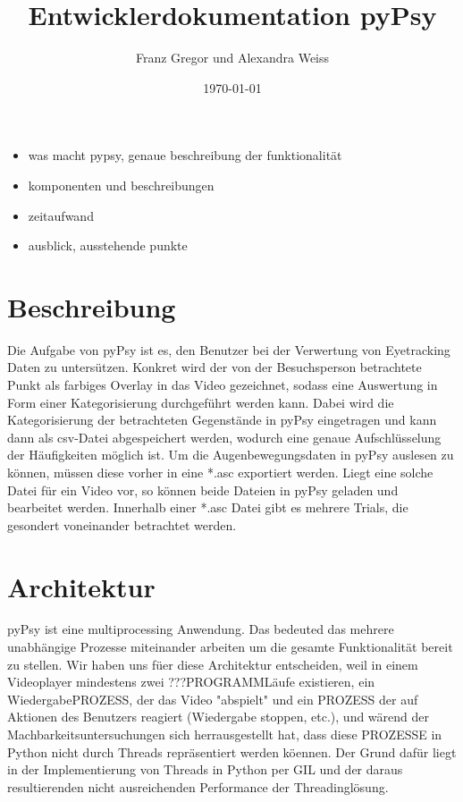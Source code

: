 \documentclass[a4paper,draft]{scrartcl}
\title{Entwicklerdokumentation pyPsy}
\author{Franz Gregor und Alexandra Weiss}
\date{\today}
\begin{document}
\maketitle
\newpage
\tableofcontents
\begin{itemize}
	\item was macht pypsy, genaue beschreibung der funktionalität
	\item komponenten und beschreibungen 
	\item zeitaufwand
	\item ausblick, ausstehende punkte
\end{itemize}
\newpage
\section{Beschreibung}
Die Aufgabe von pyPsy ist es, den Benutzer bei der Verwertung von Eyetracking Daten zu untersützen. Konkret wird der von der Besuchsperson betrachtete Punkt als farbiges Overlay in das Video gezeichnet, sodass eine Auswertung in Form einer Kategorisierung durchgeführt werden kann. Dabei wird die Kategorisierung der betrachteten Gegenstände in pyPsy eingetragen und kann dann als csv-Datei abgespeichert werden, wodurch eine genaue Aufschlüsselung der Häufigkeiten möglich ist. 
Um die Augenbewegungsdaten in pyPsy auslesen zu können, müssen diese vorher in eine *.asc exportiert werden. Liegt eine solche Datei für ein Video vor, so können beide Dateien in pyPsy geladen und bearbeitet werden.
Innerhalb einer *.asc Datei gibt es mehrere Trials, die gesondert voneinander betrachtet werden.

\section{Architektur}
pyPsy ist eine multiprocessing Anwendung.
Das bedeuted das mehrere unabh\"angige Prozesse miteinander arbeiten um die gesamte Funktionalit\"at bereit zu stellen.
Wir haben uns f\"uer diese Architektur entscheiden, weil in einem Videoplayer mindestens zwei ???PROGRAMML\"aufe existieren, ein WiedergabePROZESS, der das Video "abspielt" und ein PROZESS der auf Aktionen des Benutzers reagiert (Wiedergabe stoppen, etc.), und w\"arend der Machbarkeitsuntersuchungen sich herrausgestellt hat, dass diese PROZESSE in Python nicht durch Threads repr\"asentiert werden k\"oennen.
Der Grund daf\"ur liegt in der Implementierung von Threads in Python per GIL und der daraus resultierenden nicht ausreichenden Performance der Threadingl\"osung.
\end{document}
